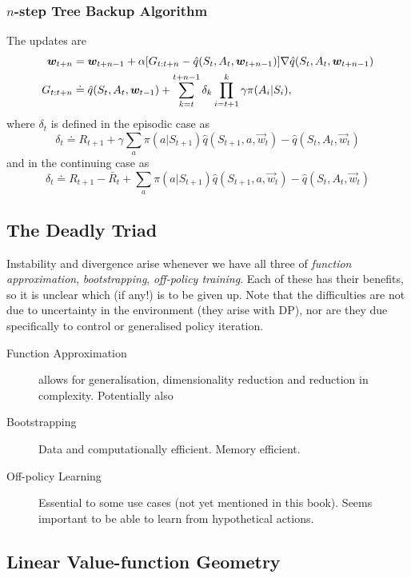 \subsubsection*{$n$-step Tree Backup Algorithm}
The updates are
\begin{align}
    \boldsymbol{w}_{t+n} &= \boldsymbol{w}_{t+n-1} + \alpha [G_{t:t+n} - \hat{q}(S_t, A_t, \boldsymbol{w}_{t+n-1})]\nabla \hat{q}(S_t, A_t, \boldsymbol{w}_{t+n-1}) \\
    G_{t:t+n} &\doteq \hat{q}(S_t, A_t, \boldsymbol{w}_{t-1}) + \sum_{k=t}^{t+n-1} \delta_k \prod_{i=t+1}^k \gamma \pi(A_i \vert{} S_i),
\end{align}
where $\delta_t$ is defined in the episodic case as
\[
    \delta_t \doteq R_{t+1} + \gamma \sum_a \pi(a \vert{} S_{t+1}) \hat{q}(S_{t+1}, a, \vec{w}_t) -  \hat{q}(S_t, A_t, \vec{w}_t)
\]
and in the continuing case as
\[
    \delta_t \doteq R_{t+1}  - \bar{R}_t + \sum_a \pi(a \vert{} S_{t+1}) \hat{q}(S_{t+1}, a, \vec{w}_t) -  \hat{q}(S_t, A_t, \vec{w}_t)
\]


\setcounter{subsection}{2}
\subsection{The Deadly Triad}
Instability and divergence arise whenever we have all three of \emph{function approximation}, \emph{bootstrapping}, \emph{off-policy training}. Each of these has their benefits, so it is unclear which (if any!) is to be given up. Note that the difficulties are not due to uncertainty in the environment (they arise with DP), nor are they due specifically to control or generalised policy iteration.

\begin{description}
    \item[Function Approximation] allows for generalisation, dimensionality reduction and reduction in complexity. Potentially also 
    \item[Bootstrapping] Data and computationally efficient. Memory efficient.
    \item[Off-policy Learning] Essential to some use cases (not yet mentioned in this book). Seems important to be able to learn from hypothetical actions.
\end{description}

\subsection{Linear Value-function Geometry}





